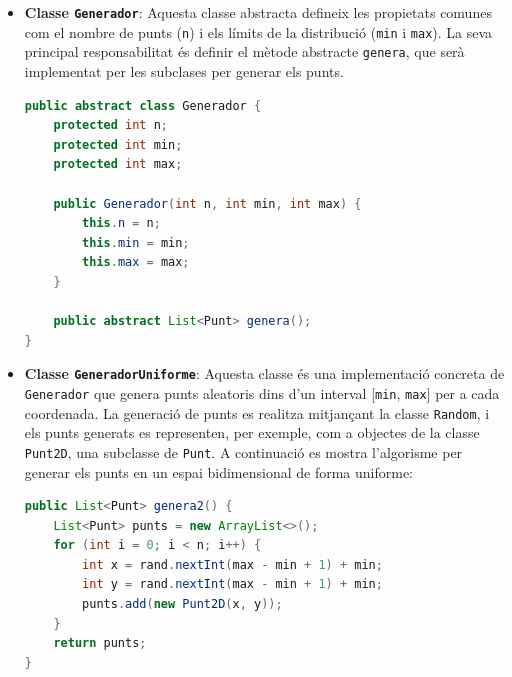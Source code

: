 \documentclass{ieeetj}
\begin{document}
\begin{itemize} \item \textbf{Classe \texttt{Generador}}: Aquesta classe abstracta defineix les propietats comunes com el nombre de punts (\texttt{n}) i els límits de la distribució (\texttt{min} i \texttt{max}). La seva principal responsabilitat és definir el mètode abstracte \texttt{genera}, que serà implementat per les subclases per generar els punts.

\begin{lstlisting}[language=java]
public abstract class Generador {
    protected int n;
    protected int min;
    protected int max;

    public Generador(int n, int min, int max) {
        this.n = n;
        this.min = min;
        this.max = max;
    }

    public abstract List<Punt> genera();
}


\end{lstlisting}

\item \textbf{Classe \texttt{GeneradorUniforme}}: Aquesta classe és una implementació concreta de \texttt{Generador} que genera punts aleatoris dins d'un interval [\texttt{min}, \texttt{max}] per a cada coordenada. La generació de punts es realitza mitjançant la classe \texttt{Random}, i els punts generats es representen, per exemple, com a objectes de la classe \texttt{Punt2D}, una subclasse de \texttt{Punt}. A continuació es mostra l'algorisme per generar els punts en un espai bidimensional de forma uniforme:

\begin{lstlisting}[language=java]
public List<Punt> genera2() {
    List<Punt> punts = new ArrayList<>();
    for (int i = 0; i < n; i++) {
        int x = rand.nextInt(max - min + 1) + min;
        int y = rand.nextInt(max - min + 1) + min;
        punts.add(new Punt2D(x, y));
    }
    return punts;
}
\end{lstlisting}


\end{itemize}
\end{document}
